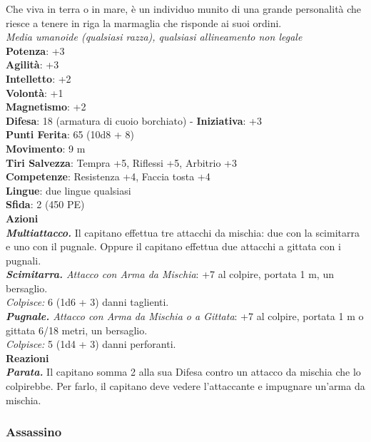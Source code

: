 \begin{multicols}{2}
Che viva in terra o in mare, è un individuo munito di una grande personalità che riesce a tenere in riga la marmaglia che risponde ai suoi ordini.\\
\emph{Media umanoide (qualsiasi razza), qualsiasi allineamento non legale}\\
\textbf{Potenza}: +3\\
\textbf{Agilità}: +3\\
\textbf{Intelletto}: +2\\
\textbf{Volontà}: +1\\
\textbf{Magnetismo}: +2\\
\textbf{Difesa}: 18 (armatura di cuoio borchiato) - \textbf{Iniziativa}: +3\\
\textbf{Punti Ferita}: 65 (10d8 + 8)\\
\textbf{Movimento}: 9 m\\
\textbf{Tiri Salvezza}: Tempra +5, Riflessi +5, Arbitrio +3 \\
\textbf{Competenze}: Resistenza +4, Faccia tosta +4\\
\textbf{Lingue}: due lingue qualsiasi\\
\textbf{Sfida}: 2 (450 PE)\smallskip\\
\smallskip\textbf{Azioni}\\
\emph{\textbf{Multiattacco.}} Il capitano effettua tre attacchi da mischia: due con la scimitarra e uno con il pugnale. Oppure il capitano effettua due attacchi a gittata con i pugnali.\\
\emph{\textbf{Scimitarra.} Attacco con Arma da Mischia}: +7 al colpire, portata 1 m, un bersaglio.\\
\emph{Colpisce:} 6 (1d6 + 3) danni taglienti.\\
\emph{\textbf{Pugnale.} Attacco con Arma da Mischia o a Gittata}: +7 al colpire, portata 1 m o gittata 6/18 metri, un bersaglio.\\
\emph{Colpisce:} 5 (1d4 + 3) danni perforanti.\\
\textbf{Reazioni}\\
\emph{\textbf{Parata.}} Il capitano somma 2 alla sua Difesa contro un attacco da mischia che lo colpirebbe. Per farlo, il capitano deve vedere l'attaccante e impugnare un'arma da mischia.

\subsubsection{Assassino}


\end{multicols}
